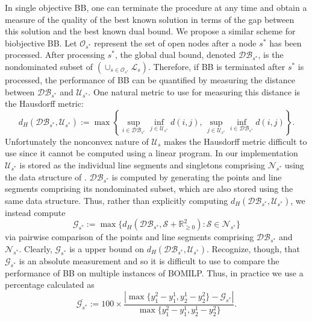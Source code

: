 \documentclass[11.5pt]{article}
\newcommand{\R}{\mathbb{R}}
\newcommand{\U}{\mathcal{U}}
\renewcommand{\L}{\mathcal{L}}
\newcommand{\N}{\mathcal{N}}
\newcommand{\nonneg}{\R^{2}_{\ge 0}}
\begin{document}
In single objective BB, one can terminate the procedure at any time and obtain a measure of the quality of the best known solution in terms of the gap between this solution and the best known dual bound. %
We propose a similar scheme for biobjective BB. %
Let $\mathscr{O}_{s^*}$ represent the set of open nodes after a node $s^*$ has been processed. After processing $s^*$, the global dual bound, denoted $\mathcal{DB}_{s^*}$, is the nondominated subset of $\left(\cup_{s\in\mathscr{O}_{s^*}}\L_s\right)$. Therefore, if BB is terminated after $s^*$ is processed, the performance of BB can be quantified by measuring the distance between $\mathcal{DB}_{s^*}$ and $\U_{s^*}$. One natural metric to use for measuring this distance %
is the Hausdorff metric: \[d_H(\mathcal{DB}_{s^*},\U_{s^*}) := \max \left\{\sup_{i\in \mathcal{DB}_{s^*}}\inf_{j\in \U_{s^*}} d(i,j),\, \sup_{j\in \U_{s^*}}\inf_{i\in \mathcal{DB}_{s^*}} d(i,j) \right\}.\] %
Unfortunately the nonconvex nature of $\U_s$ makes the Hausdorff metric difficult to use %
since it cannot be computed using a linear program. In our implementation $\U_{s^*}$ is stored as the individual line segments and singletons comprising $\N_{s^*}$ using the data structure of \citep{treestructure}. $\mathcal{DB}_{s^*}$ is computed by generating the points and line segments comprising its nondominated subset, which are also stored using the same data structure. Thus, rather than explicitly computing $d_H(\mathcal{DB}_{s^*},\U_{s^*})$, we instead compute 
\begin{equation}
\mathcal{G}_{s^*}:=\max\{d_H(\mathcal{DB}_{s^*},\mathcal{S}+\nonneg): \mathcal{S} \in \N_{s^*}\}
\end{equation}
via pairwise comparison of the points and line segments comprising $\mathcal{DB}_{s^*}$ and $\N_{s^*}$. Clearly, $\mathcal{G}_{s^*}$ is a upper bound on $d_H(\mathcal{DB}_{s^*},\U_{s^*})$. Recognize, though, that $\mathcal{G}_{s^*}$ is an absolute measurement and so it is difficult to use to compare the performance of BB on multiple instances of BOMILP. Thus, in practice we use a percentage calculated as 
\begin{equation}
\overline{\mathcal{G}_{s^*}} := 100\times\frac{\left|\max\{y^2_1-y^1_1,y^1_2-y^2_2\} - \mathcal{G}_{s^*}\right|}{\max\{y^2_1-y^1_1,y^1_2-y^2_2\}}.
\end{equation}
\end{document}
